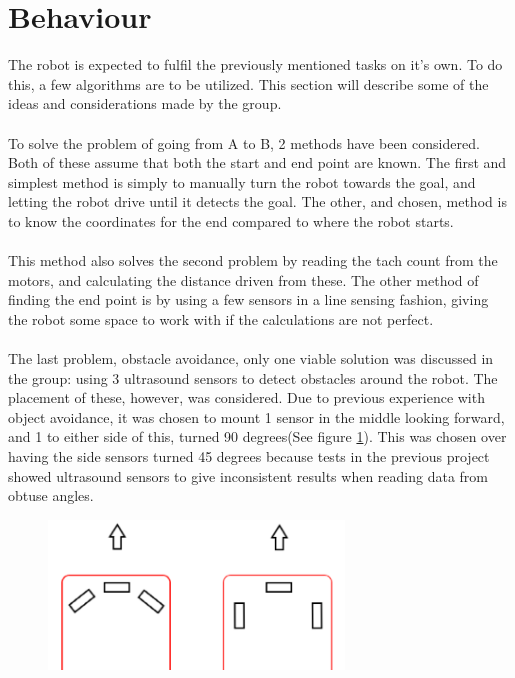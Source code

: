 \section{Behaviour}
The robot is expected to fulfil the previously mentioned tasks on it's own. To do this, a few algorithms are to be utilized. This section will describe some of the ideas and considerations made by the group.\\\\
To solve the problem of going from A to B, 2 methods have been considered. Both of these assume that both the start and end point are known. The first and simplest method is simply to manually turn the robot towards the goal, and letting the robot drive until it detects the goal. The other, and chosen, method is to know the coordinates for the end compared to where the robot starts.\\\\
This method also solves the second problem by reading the tach count from the motors, and calculating the distance driven from these. The other method of finding the end point is by using a few sensors in a line sensing fashion, giving the robot some space to work with if the calculations are not perfect.\\\\
The last problem, obstacle avoidance, only one viable solution was discussed in the group: using 3 ultrasound sensors to detect obstacles around the robot. The placement of these, however, was considered. Due to previous experience with object avoidance, it was chosen to mount 1 sensor in the middle looking forward, and 1 to either side of this, turned 90 degrees(See figure \ref{Hardware_diagram}). This was chosen over having the side sensors turned 45 degrees because tests in the previous project showed ultrasound sensors to give inconsistent results when reading data from obtuse angles.

\begin{figure}[!ht]
	\centering
	\includegraphics[width=0.7\textwidth]{figures/sensorMountingTheory.PNG}
	\caption{}
	\label{Hardware_diagram}
\end{figure}